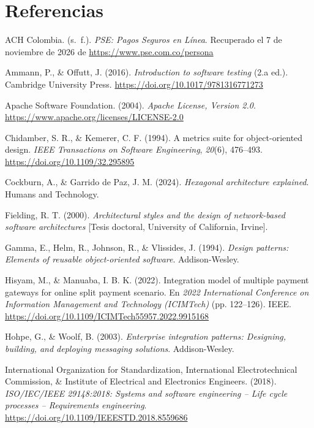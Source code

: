 \section{Referencias}

\begingroup\sloppy
\setlength{\parindent}{-1.5em}
\setlength{\leftskip}{1.5em}
\setlength{\parskip}{0.6em}

\noindent ACH Colombia. (s.~f.). \textit{PSE: Pagos Seguros en Línea}. Recuperado el 7 de noviembre de 2026 de \url{https://www.pse.com.co/persona}

\noindent Ammann, P., \& Offutt, J. (2016). \textit{Introduction to software testing} (2.a ed.). Cambridge University Press. \url{https://doi.org/10.1017/9781316771273}

\noindent Apache Software Foundation. (2004). \textit{Apache License, Version 2.0}. \url{https://www.apache.org/licenses/LICENSE-2.0}

\noindent Chidamber, S. R., \& Kemerer, C. F. (1994). A metrics suite for object-oriented design. \textit{IEEE Transactions on Software Engineering}, \textit{20}(6), 476--493. \url{https://doi.org/10.1109/32.295895}

\noindent Cockburn, A., \& Garrido de Paz, J. M. (2024). \textit{Hexagonal architecture explained}. Humans and Technology.

\noindent Fielding, R. T. (2000). \textit{Architectural styles and the design of network-based software architectures} [Tesis doctoral, University of California, Irvine].

\noindent Gamma, E., Helm, R., Johnson, R., \& Vlissides, J. (1994). \textit{Design patterns: Elements of reusable object-oriented software}. Addison-Wesley.

\noindent Hisyam, M., \& Manuaba, I. B. K. (2022). Integration model of multiple payment gateways for online split payment scenario. En \textit{2022 International Conference on Information Management and Technology (ICIMTech)} (pp. 122--126). IEEE. \url{https://doi.org/10.1109/ICIMTech55957.2022.9915168}

\noindent Hohpe, G., \& Woolf, B. (2003). \textit{Enterprise integration patterns: Designing, building, and deploying messaging solutions}. Addison-Wesley.

\noindent International Organization for Standardization, International Electrotechnical Commission, \& Institute of Electrical and Electronics Engineers. (2018). \textit{ISO/IEC/IEEE 29148:2018: Systems and software engineering -- Life cycle processes -- Requirements engineering}. \url{https://doi.org/10.1109/IEEESTD.2018.8559686}

